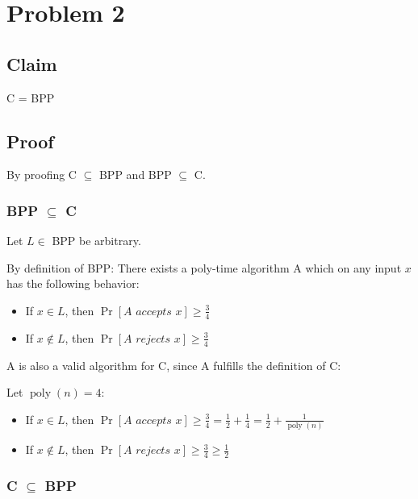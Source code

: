 \section*{Problem 2}

\subsection*{Claim}

C = BPP


\subsection*{Proof}

By proofing C $\subseteq$ BPP and BPP $\subseteq$ C.

\subsubsection*{BPP $\subseteq$ C}

Let $L \in$ BPP be arbitrary.

By definition of BPP: There exists a poly-time algorithm A which on any input $x$ has the following behavior:

\begin{itemize}
    \item If $x \in L$, then $\operatorname{Pr}[\textit{A accepts } x] \geq \frac{3}{4}$
    
    \item If $x \notin L$, then $\operatorname{Pr}[\textit{A rejects } x] \geq \frac{3}{4}$
\end{itemize}

A is also a valid algorithm for C, since A fulfills the definition of C:

Let $\operatorname{poly}(n) = 4$:

\begin{itemize}
    \item If $x \in L$, then $\operatorname{Pr}[\textit{A accepts } x] \geq \frac{3}{4} = \frac{1}{2} + \frac{1}{4} = \frac{1}{2} + \frac{1}{\operatorname{poly}(n)}$
    
    \item If $x \notin L$, then $\operatorname{Pr}[\textit{A rejects } x] \geq \frac{3}{4} \geq \frac{1}{2}$
\end{itemize}

\subsubsection*{C $\subseteq$ BPP}

